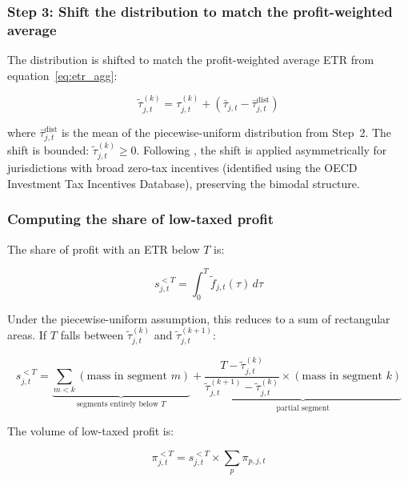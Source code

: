 \documentclass[11pt,a4paper]{article}
\begin{document}
\subsubsection{Step 3: Shift the distribution to match the profit-weighted average}

The distribution is shifted to match the profit-weighted average ETR from equation~\eqref{eq:etr_agg}:

\begin{equation}\label{eq:shift}
\tilde{\tau}_{j,t}^{(k)} = \tau_{j,t}^{(k)} + \left(\bar{\tau}_{j,t} - \bar{\tau}_{j,t}^{\text{dist}}\right)
\end{equation}

where $\bar{\tau}_{j,t}^{\text{dist}}$ is the mean of the piecewise-uniform distribution from Step~2. The shift is bounded: $\tilde{\tau}_{j,t}^{(k)} \geq 0$. Following \citet{hugger2025}, the shift is applied asymmetrically for jurisdictions with broad zero-tax incentives (identified using the OECD Investment Tax Incentives Database), preserving the bimodal structure.

\subsubsection{Computing the share of low-taxed profit}

The share of profit with an ETR below $T$ is:

\begin{equation}\label{eq:lowtax_share}
s_{j,t}^{<T} = \int_0^{T} \tilde{f}_{j,t}(\tau) \, d\tau
\end{equation}

Under the piecewise-uniform assumption, this reduces to a sum of rectangular areas. If $T$ falls between $\tilde{\tau}_{j,t}^{(k)}$ and $\tilde{\tau}_{j,t}^{(k+1)}$:

\begin{equation}\label{eq:lowtax_share_pw}
s_{j,t}^{<T} = \underbrace{\sum_{m < k} (\text{mass in segment } m)}_{\text{segments entirely below } T} + \underbrace{\frac{T - \tilde{\tau}_{j,t}^{(k)}}{\tilde{\tau}_{j,t}^{(k+1)} - \tilde{\tau}_{j,t}^{(k)}} \times (\text{mass in segment } k)}_{\text{partial segment}}
\end{equation}

The volume of low-taxed profit is:

\begin{equation}\label{eq:lowtax_profit}
\pi_{j,t}^{<T} = s_{j,t}^{<T} \times \sum_p \pi_{p,j,t}
\end{equation}
\end{document}

